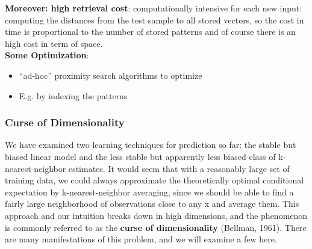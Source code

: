 \documentclass[../main.tex]{subfiles}
\begin{document}
\textbf{Moreover: high retrieval cost}:
computationally intensive for each new input: computing the distances from the test sample to all stored vectors, so the cost in time is proportional to the number of stored patterns and of course there is an high cost in term of space.\\

\textbf{Some Optimization}:
\begin{itemize}
    \item “ad-hoc” proximity search algorithms to optimize
    \item E.g. by indexing the patterns
\end{itemize}

\subsubsection{Curse of Dimensionality}
We have examined two learning techniques for prediction so far: the stable but biased linear model and the less stable but apparently less biased class of k-nearest-neighbor estimates. It would seem that with a reasonably large set of training data, we could always approximate the theoretically optimal conditional expectation by k-nearest-neighbor averaging, since we should be able to find a fairly large neighborhood of observations close to any x and average them. This approach and our intuition breaks down in high dimensions, and the phenomenon is commonly referred to as the \textbf{curse of dimensionality} (Bellman, 1961). There are many manifestations of this problem, and we will examine a few here.
\end{document}

